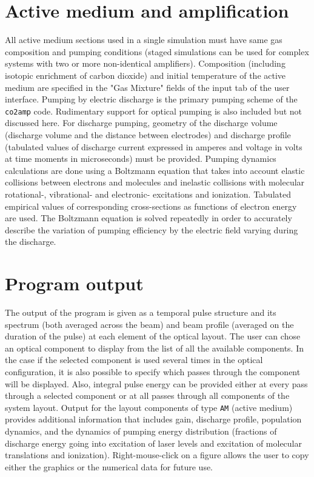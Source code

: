 \documentclass{report}
\begin{document}
\section{Active medium and amplification}
All active medium sections used in a single simulation must have same gas composition and pumping conditions (staged simulations can be used for complex systems with two or more non-identical amplifiers).  Composition (including isotopic enrichment of carbon dioxide) and initial temperature of the active medium are specified in the "Gas Mixture" fields of the input tab of the user interface.
Pumping by electric discharge is the primary pumping scheme of the \texttt{co2amp} code. Rudimentary support for optical pumping is also included but not discussed here. For discharge pumping, geometry of the discharge volume (discharge volume and the distance between electrodes) and discharge profile (tabulated values of discharge current expressed in amperes and voltage in volts at time moments in microseconds) must be provided. Pumping dynamics calculations are done using a Boltzmann equation that takes into account elastic collisions between electrons and molecules and inelastic collisions with molecular rotational-, vibrational- and electronic- excitations and ionization. Tabulated empirical values of corresponding cross-sections as functions of electron energy are used. The Boltzmann equation is solved repeatedly in order to accurately describe the variation of pumping efficiency by the electric field varying during the discharge. 


\section{Program output}
The output of the program is given as a temporal pulse structure and its spectrum (both averaged across the beam) and beam profile (averaged on the duration of the pulse) at each element of the optical layout. The user can chose an optical component to display from the list of all the available components. In the case if the selected component is used several times in the optical configuration, it is also possible to specify which passes through the component will be displayed. Also, integral pulse energy can be provided either at every pass through a selected component or at all passes through all components of the system layout.
Output for the layout components of type \texttt{AM} (active medium) provides additional information that includes gain, discharge profile, population dynamics, and the dynamics of pumping energy distribution (fractions of discharge energy going into excitation of laser levels and excitation of molecular translations and ionization).
Right-mouse-click on a figure allows the user to copy either the graphics or the numerical data for future use.

                          


                          
\end{document}

